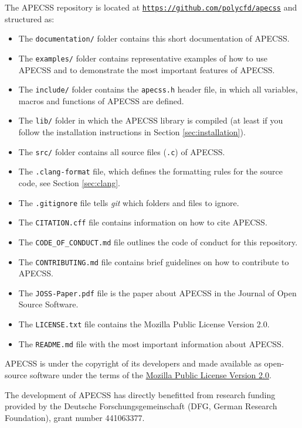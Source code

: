 The APECSS repository is located at \href{https://github.com/polycfd/apecss}{\texttt{https://github.com/polycfd/apecss}} and structured as:\vspace{-1em}
\begin{itemize}[noitemsep]
    \item The {\tt documentation/} folder contains this short documentation of APECSS.
    \item The {\tt examples/} folder contains representative examples of how to use APECSS and to demonstrate the most important features of APECSS. 
    \item The {\tt include/} folder contains the {\tt apecss.h} header file, in which all variables, macros and functions of APECSS are defined.
    \item The {\tt lib/} folder in which the APECSS library is compiled (at least if you follow the installation instructions in Section \ref{sec:installation}).
    \item The {\tt src/} folder contains all source files ({\tt *.c}) of APECSS.
    \item The {\tt .clang-format} file, which defines the formatting rules for the source code, see Section \ref{sec:clang}.
    \item The {\tt .gitignore} file tells \textit{git} which folders and files to ignore.
    \item The {\tt CITATION.cff} file contains information on how to cite APECSS.
    \item The {\tt CODE\_OF\_CONDUCT.md} file outlines the code of conduct for this repository.
    \item The {\tt CONTRIBUTING.md} file contains brief guidelines on how to contribute to APECSS.
    \item The {\tt JOSS-Paper.pdf} file is the paper about APECSS in the Journal of Open Source Software.
    \item The {\tt LICENSE.txt} file contains the Mozilla Public License Version 2.0.
    \item The {\tt README.md} file with the most important information about APECSS.
\end{itemize}

APECSS is under the copyright of its developers and made available as open-source software under the terms of the \href{https://www.mozilla.org/en-US/MPL/2.0/}{Mozilla Public License Version 2.0}.

The development of APECSS has directly benefitted from research funding provided by the Deutsche Forschungsgemeinschaft (DFG, German Research Foundation), grant number 441063377.
